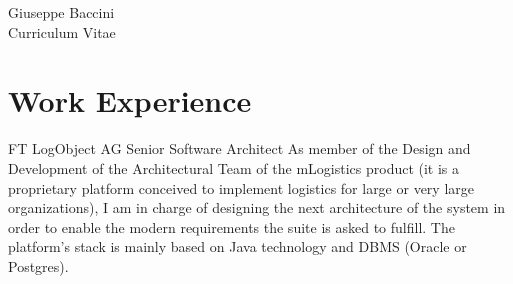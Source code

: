\documentclass[10pt]{article} %
\begin{document}
\begin{paracol}{2} %


\parbox[top][0.12\textheight][c]{\linewidth}{ %
	\vspace{-0.04\textheight} %
	\centering %
	{\sffamily\Huge Giuseppe Baccini}\\\medskip %
	{\Huge\color{headings}\cvtextfont Curriculum Vitae}
}


\section{Work Experience}





{FT} %
{LogObject AG} %
{Senior Software Architect} %
{As member of the Design and Development of the Architectural Team of the mLogistics product
(it is a proprietary platform conceived to implement logistics for large or very large organizations),
I am in charge of designing the next architecture of the system in order to enable the modern
requirements the suite is asked to fulfill. The platform's stack is mainly based on Java technology
and DBMS (Oracle or Postgres).}


\end{paracol}
\end{document}
